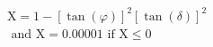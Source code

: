 \documentclass[12pt]{article}
\begin{document}
\begin{displaymath}
\begin{array}{c}{\mathrm{X}=1-[\tan (\varphi)]^{2}[\tan (\delta)]^{2}} \\ {\text { and } \mathrm{X}=0.00001 \text { if } \mathrm{X} \leq 0}\end{array}
\end{displaymath}
\end{document}

